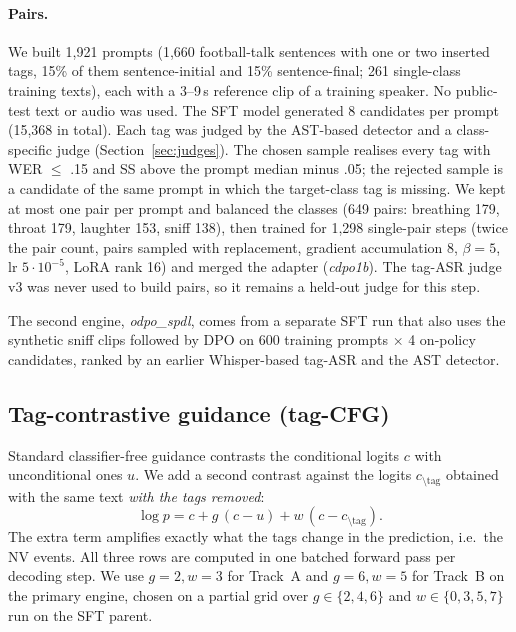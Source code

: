 \documentclass[11pt]{article}
\begin{document}
\paragraph{Pairs.} We built 1{,}921 prompts (1{,}660 football-talk sentences with one or two inserted tags, 15\% of
them sentence-initial and 15\% sentence-final; 261 single-class training texts), each with a 3--9\,s reference clip of a
training speaker. No public-test text or audio was used. The SFT model generated 8 candidates per prompt (15{,}368 in
total). Each tag was judged by the AST-based detector and a class-specific judge (Section~\ref{sec:judges}). The chosen
sample realises every tag with WER $\le$ .15 and SS above the prompt median minus .05; the rejected sample is a candidate
of the same prompt in which the target-class tag is missing. We kept at most one pair per prompt and balanced the classes
(649 pairs: breathing 179, throat 179, laughter 153, sniff 138), then trained for 1{,}298 single-pair steps (twice the pair count, pairs sampled with replacement,
gradient accumulation 8,
$\beta{=}5$, lr $5\cdot10^{-5}$, LoRA rank 16) and merged the adapter (\emph{cdpo1b}). The tag-ASR judge v3 was never
used to build pairs, so it remains a held-out judge for this step.

The second engine, \emph{odpo\_spdl}, comes from a separate SFT run that also uses the synthetic sniff clips followed by DPO on 600
training prompts $\times$ 4 on-policy candidates, ranked by an earlier Whisper-based tag-ASR \citep{radford2023whisper}
and the AST detector.

\subsection{Tag-contrastive guidance (tag-CFG)}
Standard classifier-free guidance \citep{ho2022cfg} contrasts the conditional logits $c$ with unconditional ones $u$.
We add a second contrast against the logits $c_{\setminus\mathrm{tag}}$ obtained with the same text \emph{with the tags
removed}:
\begin{equation*}
\log p = c + g\,(c-u) + w\,(c - c_{\setminus\mathrm{tag}}).
\end{equation*}
The extra term amplifies exactly what the tags change in the prediction, i.e.\ the NV events. All three rows are
computed in one batched forward pass per decoding step. We use $g{=}2, w{=}3$ for Track~A and $g{=}6, w{=}5$ for
Track~B on the primary engine, chosen on a partial grid over $g\in\{2,4,6\}$ and $w\in\{0,3,5,7\}$ run on the SFT parent.
\end{document}
